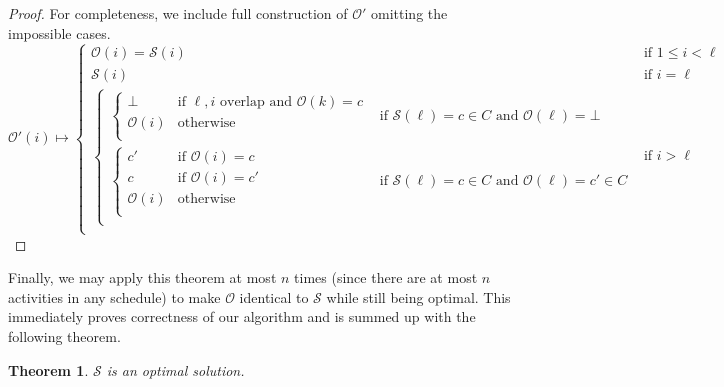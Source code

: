 \documentclass{article}
\theoremstyle{plain}%
\newtheorem{thm}{Theorem}[section]
\theoremstyle{definition}
\theoremstyle{remark}
\begin{document}
\begin{proof}
    For completeness, we include full construction of $\mathcal{O}'$ omitting the impossible cases.
    \begin{equation}
        \mathcal{O}'(i) \mapsto
            \begin{cases}
                \mathcal{O}(i) = \mathcal{S}(i) & \text{if $1 \le i < \ell$} \\
                \mathcal{S}(i) & \text{if $i = \ell$} \\
                \begin{cases} 
                    \begin{cases} 
                        \bot & \text{if $\ell,i$ overlap and $\mathcal{O}(k) = c$} \\
                        \mathcal{O}(i) & \text{otherwise} \\
                    \end{cases} 
                            & \text{if $\mathcal{S}(\ell) = c \in C$ and $\mathcal{O}(\ell) =\bot$} \\
                    \begin{cases} 
                        c' & \text{if $\mathcal{O}(i) = c$} \\
                        c & \text{if $\mathcal{O}(i) = c'$} \\
                        \mathcal{O}(i) & \text{otherwise} \\
                    \end{cases} 
                            & \text{if $\mathcal{S}(\ell) = c \in C$ and $\mathcal{O}(\ell) =c' \in C$} \\
                \end{cases} 
                    & \text{if $i > \ell$} \\
            \end{cases}
    \end{equation}
\end{proof}
Finally, we may apply this theorem at most $n$ times (since there are at most
    $n$ activities in any schedule) to make $\mathcal{O}$ 
    identical to $\mathcal{S}$ while still being optimal.
This immediately proves correctness of our algorithm and is summed up with the
    following theorem.
\begin{thm}
    $\mathcal{S}$ is an optimal solution.
\end{thm}
\end{document}

